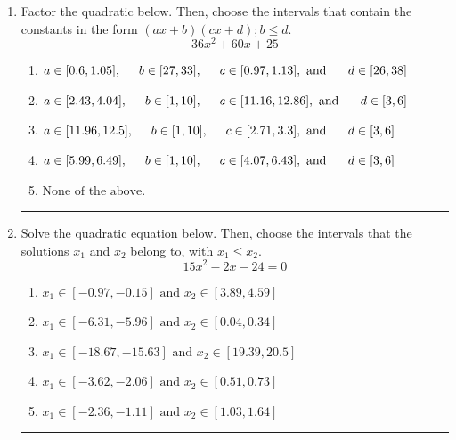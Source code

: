 \documentclass[14pt]{extbook}
\newcommand{\litem}[1]{\item#1\hspace*{-1cm}\rule{\textwidth}{0.4pt}}
\begin{document}
\begin{enumerate}
{\begin{enumerate}[label=\Alph*.]
\end{enumerate} }
\litem{
Factor the quadratic below. Then, choose the intervals that contain the constants in the form $(ax+b)(cx+d); b \leq d.$\[ 36x^{2} +60 x + 25 \]\begin{enumerate}[label=\Alph*.]
\item \( a \in [0.6, 1.05], \hspace*{5mm} b \in [27, 33], \hspace*{5mm} c \in [0.97, 1.13], \text{ and } \hspace*{5mm} d \in [26, 38] \)
\item \( a \in [2.43, 4.04], \hspace*{5mm} b \in [1, 10], \hspace*{5mm} c \in [11.16, 12.86], \text{ and } \hspace*{5mm} d \in [3, 6] \)
\item \( a \in [11.96, 12.5], \hspace*{5mm} b \in [1, 10], \hspace*{5mm} c \in [2.71, 3.3], \text{ and } \hspace*{5mm} d \in [3, 6] \)
\item \( a \in [5.99, 6.49], \hspace*{5mm} b \in [1, 10], \hspace*{5mm} c \in [4.07, 6.43], \text{ and } \hspace*{5mm} d \in [3, 6] \)
\item \( \text{None of the above.} \)

\end{enumerate} }
\litem{
Solve the quadratic equation below. Then, choose the intervals that the solutions $x_1$ and $x_2$ belong to, with $x_1 \leq x_2$.\[ 15x^{2} -2 x -24 = 0 \]\begin{enumerate}[label=\Alph*.]
\item \( x_1 \in [-0.97, -0.15] \text{ and } x_2 \in [3.89, 4.59] \)
\item \( x_1 \in [-6.31, -5.96] \text{ and } x_2 \in [0.04, 0.34] \)
\item \( x_1 \in [-18.67, -15.63] \text{ and } x_2 \in [19.39, 20.5] \)
\item \( x_1 \in [-3.62, -2.06] \text{ and } x_2 \in [0.51, 0.73] \)
\item \( x_1 \in [-2.36, -1.11] \text{ and } x_2 \in [1.03, 1.64] \)


\end{enumerate}}
\end{enumerate}
\end{document}
